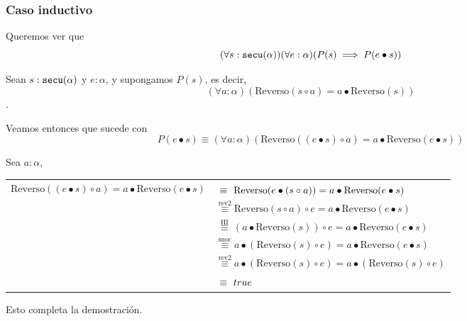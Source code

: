 \documentclass[hidelinks,a4paper,10pt, nofootinbib]{article}
\newcommand{\secu}{\ensuremath\texttt{secu}(\alpha)}
\newcommand{\rev}{\text{Reverso}}
\newcommand{\cons}{\bullet}
\newcommand{\snoc}{\circ}
\newcommand{\por}[1]{\overset{\text{#1}}{\equiv}}
\newcommand{\ph}{\phantom{rev1}}
\begin{document}
\subsubsection*{Caso inductivo}
Queremos ver que \[(\forall s : \secu) (\forall e : \alpha) (P(s) \implies P(e \cons s)) \]


Sean $s : \secu$ y $e : \alpha$, y supongamos $P(s)$, es decir, \[(\forall a : \alpha) (\rev(s \circ a) = a \cons \rev(s))\].


Veamos entonces que sucede con \[P(e \cons s) \equiv (\forall a : \alpha) (\rev((e \cons s) \circ a) = a \cons \rev(e \cons s))\]

Sea $ a : \alpha$, 
\begin{center}
\begin{tabular}{r l}
$\rev((e \cons s) \snoc a) = a \cons \rev(e \cons s)$ & $\por{\ph} \rev(e \cons (s \snoc a)) = a \cons \rev(e \cons s)$ \\
               & $\por{rev2} \rev(s \snoc a) \snoc e= a \cons \rev(e \cons s)$ \\
               & $\por{ HI } (a \cons \rev(s)) \snoc e= a \cons \rev(e \cons s)$ \\
               & $\por{snoc} a \cons (\rev(s) \snoc e) = a \cons \rev(e \cons s)$ \\
               & $\por{rev2} a \cons (\rev(s) \snoc e) = a \cons (\rev(s) \snoc e)$ \\
               & $\por{\ph} true$ \\
\end{tabular}
\end{center}


Esto completa la demostración.
\end{document}
